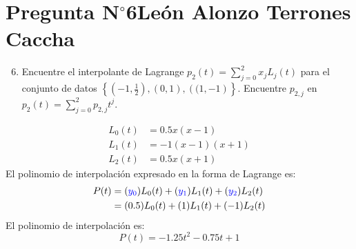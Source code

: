 \section{Pregunta N$^{\circ}$6\qquad León Alonzo Terrones Caccha}




\begin{frame}
	\begin{enumerate}\setcounter{enumi}{5}
		\item

		      Encuentre el interpolante de Lagrange
		      \begin{math}
			      p_{2}\left(t\right)=
			      \sum\limits_{j=0}^{2}
			      x_{j}
			      L_{j}\left(t\right)
		      \end{math}
		      para el conjunto de datos
		      \begin{math}
			      \left\{
			      \left(-1,\frac{1}{2}\right),
			      \left(0,1\right),
			      \left((1,-1\right)
			      \right\}
		      \end{math}.
		      Encuentre $p_{2,j}$ en
		      \begin{math}
			      p_{2}\left(t\right)=
			      \sum\limits_{j=0}^{2}
			      p_{2,j}t^{j}
		      \end{math}.
	\end{enumerate}

	\begin{solution}
        \begin{align*}
            L_{0}(t)&=0.5 x(x-1)\\
            L_{1}(t)&=-1 (x-1)(x+1)\\
            L_{2}(t)&=0.5 x(x+1)
        \end{align*}
        El polinomio de interpolación expresado en la forma de Lagrange es:
        \begin{align*}
            P(t)&=(\textcolor{blue}{y_0})L_{0}(t)+(\textcolor{blue}{y_1})L_{1}(t)+(\textcolor{blue}{y_2})L_{2}(t)\\
            &=(0.5)L_{0}(t)+(1)L_{1}(t)+(-1)L_{2}(t)
        \end{align*}
        El polinomio de interpolación es:
		$$P(t)=-1.25t^{2}-0.75t+1$$
  \end{solution}
\end{frame}
